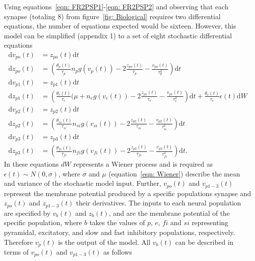 Using equations~\ref{eqn: FR2PSP1}-\ref{eqn: FR2PSP2} and observing that each synapse (totaling 8) from figure~\ref{fig: Biological} requires two differential equations, the number of equations expected would be sixteen. However, this model can be simplified (appendix 1) to a set of eight stochastic differential equations \begin{align}%
\mathrm{d}v_{po}(t)&= z_{po}(t)\mathrm{d}t\\
\mathrm{d}z_{po}(t)&=\left(\frac{\theta_{p}(t)}{\tau_{p}}n_{p}g(v_{p}(t))-2\frac{z_{po}(t)}{\tau_{p}}-\frac{v_{po}(t)}{\tau_{p}^{2}}\right)\mathrm{d}t\\
\mathrm{d}v_{p1}(t)&= z_{p1}(t)\mathrm{d}t\\
\label{eqn: Wiener}
\mathrm{d}z_{p1}(t)&=\left(\frac{\theta_{e}(t)}{\tau_{e}}(\mu +n_{e}g(v_{e}(t))-2\frac{z_{p1}(t)}{\tau_{e}}-\frac{v_{p1}(t)}{\tau_{e}^{2}}\right)\mathrm{d}t + \frac{\theta_{e}(t)}{\tau_{e}}\epsilon(t)\mathrm{d}W\\
\mathrm{d}v_{p2}(t)&= z_{p2}(t)\mathrm{d}t\\
\mathrm{d}z_{p2}(t)&=\left(\frac{\theta_{si}(t)}{\tau_{si}}n_{si}g(v_{si}(t))-2\frac{z_{p2}(t)}{\tau_{si}}-\frac{v_{p2}(t)}{\tau_{si}^{2}}\right)\mathrm{d}t\\
\mathrm{d}v_{p3}(t)&= z_{p3}(t)\mathrm{d}t\\
\mathrm{d}z_{p3}(t)&=\left(\frac{\theta_{fi}(t)}{\tau_{fi}}n_{fi}g(v_{fi}(t))-2\frac{z_{p3}(t)}{\tau_{fi}}-\frac{v_{p3}(t)}{\tau_{fi}^{2}}\right)\mathrm{d}t.
\end{align} In these equations $dW$ represents a Wiener process and is required as $\epsilon(t)\sim N(0,\sigma)$, where $\sigma$ and $\mu$ (equation~\ref{eqn: Wiener}) describe the mean and variance of the stochastic model input. Further, $v_{po}(t) $ and $v_{p1-3}(t)$ represent the membrane potential produced by a specific populations synapse and $z_{po}(t) $ and $z_{p1-3}(t)$ their derivatives. The inputs to each neural population are specified by $v_{b}(t) $ and $z_{b}(t) $, and are the membrane potential of the specific population, where $b$ takes the values of $p$, $e$, $fi$ and $si$ representing pyramidal, excitatory, and slow and fast inhibitory populations, respectively. Therefore $v_{p}(t) $ is the output of the model. All $v_{b}(t) $ can be described in terms of $v_{po}(t)$ and $v_{p1-3}(t)$ as follows \begin{align}%

\end{align}
